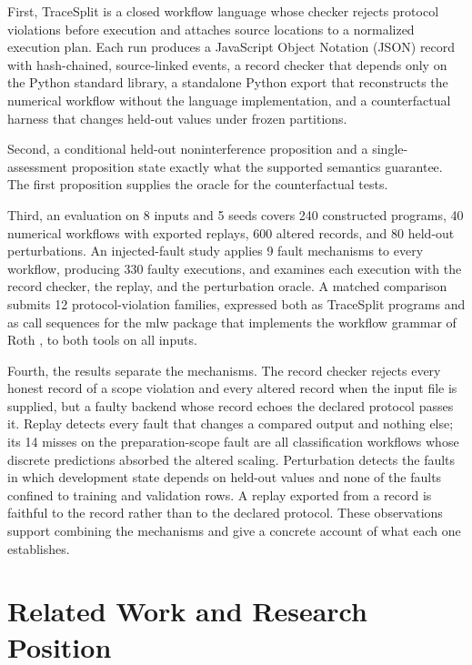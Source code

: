 \documentclass[lettersize,journal]{IEEEtran}
\newcommand{\tool}{TraceSplit}
\begin{document}
First, \tool{} is a closed workflow language whose checker rejects protocol violations before execution and attaches source locations to a normalized execution plan. Each run produces a JavaScript Object Notation (JSON) record with hash-chained, source-linked events, a record checker that depends only on the Python standard library, a standalone Python export that reconstructs the numerical workflow without the language implementation, and a counterfactual harness that changes held-out values under frozen partitions.

Second, a conditional held-out noninterference proposition and a single-assessment proposition state exactly what the supported semantics guarantee. The first proposition supplies the oracle for the counterfactual tests.

Third, an evaluation on 8 inputs and 5 seeds covers 240 constructed programs, 40 numerical workflows with exported replays, 600 altered records, and 80 held-out perturbations. An injected-fault study applies 9 fault mechanisms to every workflow, producing 330 faulty executions, and examines each execution with the record checker, the replay, and the perturbation oracle. A matched comparison submits 12 protocol-violation families, expressed both as \tool{} programs and as call sequences for the mlw package that implements the workflow grammar of Roth \cite{roth2026,mlw2026}, to both tools on all inputs.

Fourth, the results separate the mechanisms. The record checker rejects every honest record of a scope violation and every altered record when the input file is supplied, but a faulty backend whose record echoes the declared protocol passes it. Replay detects every fault that changes a compared output and nothing else; its 14 misses on the preparation-scope fault are all classification workflows whose discrete predictions absorbed the altered scaling. Perturbation detects the faults in which development state depends on held-out values and none of the faults confined to training and validation rows. A replay exported from a record is faithful to the record rather than to the declared protocol. These observations support combining the mechanisms and give a concrete account of what each one establishes.

\section{Related Work and Research Position}
\end{document}
